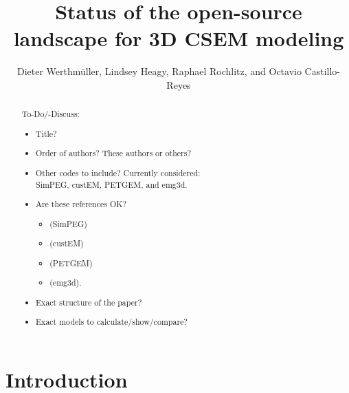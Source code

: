 \documentclass[paper,twocolumn,twoside]{geophysics}
\begin{document}
\title{Status of the open-source landscape for 3D CSEM modeling}

\renewcommand{\thefootnote}{\fnsymbol{footnote}}


\address{
\footnotemark[1]TU Delft,
Building 23,
Stevinweg 1 / PO-box 5048,
2628 CN Delft,
E-mail: \href{mailto:D.Werthmuller@tudelft.nl}{D.Werthmuller@tudelft.nl};
}


\author{%
Dieter Werthmüller\footnotemark[1],
Lindsey Heagy,
Raphael Rochlitz, and
Octavio Castillo-Reyes
}

\footer{}

\maketitle

\begin{abstract} %
%
%
%
%
%
To-Do/-Discuss:
\begin{itemize}
  \item Title?
  \item Order of authors? These authors or others?
  \item Other codes to include? Currently considered:\\
    SimPEG, custEM, PETGEM, and emg3d.
  \item Are these references OK?
    \begin{itemize}
      \item \cite{CAG.15.Cockett} (SimPEG)
      \item \cite{GEO.18.Rochlitz} (custEM)
      \item \cite{CAG.18.CastilloReyes} (PETGEM)
      \item \cite{JOSS.19.Werthmuller} (emg3d).
    \end{itemize}
  \item Exact structure of the paper?
  \item Exact models to calculate/show/compare?
\end{itemize}
\end{abstract}

\section{Introduction}
\end{document}
